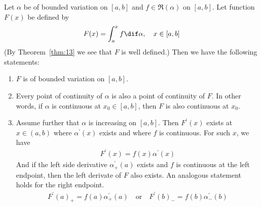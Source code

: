 \documentclass[thmcnt=section, color=blue, 12pt]{my-elegantbook}
\begin{document}
\begin{theorem} \label{thm:21}
	Let $\alpha$ be of bounded variation on $[a, b]$
	and $f \in \mathfrak{R}(\alpha)$ on $[a, b]$.
	Let function $F(x)$ be defined by
	\begin{align*}
		F(x) = \int_a^x f \dif \alpha, \quad x \in [a, b]
	\end{align*}
	(By Theorem~\ref{thm:13} we see that $F$ is well defined.)
	Then we have the following statements:
	\begin{enumerate}
		\item $F$ is of bounded variation on $[a, b]$.
		\item Every point of continuity of $\alpha$
		      is also a point of continuity of $F$.
		      In other words, if $\alpha$ is continuous at $x_0 \in [a, b]$,
		      then $F$ is also continuous at $x_0$.
		\item Assume further that $\alpha$ is increasing on $[a, b]$.
		      Then $F^\prime(x)$ exists at $x \in (a, b)$
		      where $\alpha^\prime(x)$ exists
		      and where $f$ is continuous.
		      For such $x$, we have
		      \begin{align*}
			      F^\prime(x) = f(x) \alpha^\prime(x)
		      \end{align*}
		      And if the left side derivative $\alpha^\prime_+(a)$ exists
		      and $f$ is continuous at the left endpoint,
		      then the left derivate of $F$ also exists.
		      An analogous statement holds for the right endpoint.
		      \begin{align*}
			      F^\prime(a)_+ = f(a) \alpha^\prime_+(a)
			      \quad \text{or} \quad
			      F^\prime(b)_{-} = f(b) \alpha^\prime_-(b)
		      \end{align*}
	\end{enumerate}
\end{theorem}
\end{document}
